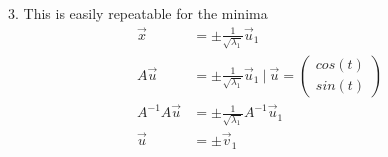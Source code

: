 \documentclass[12pt]{article}
\begin{document}
3. This is easily repeatable for the minima
\begin{align*}
    \vec{x}        & = \pm{}\tfrac{1}{\sqrt{\lambda{}_1}}\vec{u}_1                                                              \\
    A\vec{u}       & = \pm{}\tfrac{1}{\sqrt{\lambda{}_1}}\vec{u}_1 ~|~ \vec{u} = \begin{pmatrix} cos(t) \\ sin(t) \end{pmatrix} \\
    A^{-1}A\vec{u} & = \pm{}\tfrac{1}{\sqrt{\lambda{}_1}}A^{-1}\vec{u}_1                                                        \\
    \vec{u}        & = \pm{\vec{v}_1}
\end{align*}
\end{document}
